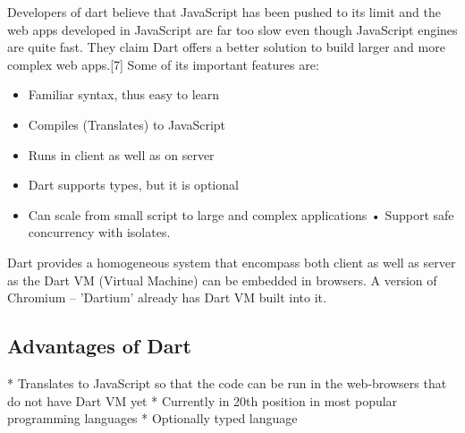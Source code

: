 Developers of dart believe that JavaScript has been pushed to its limit and the web apps developed in JavaScript are far too slow even though JavaScript engines are quite fast. They claim Dart offers a better solution to build larger and more complex web apps.[7]
Some of its important features are:
  \begin{itemize}
  \item Familiar syntax, thus easy to learn
  \item Compiles (Translates) to JavaScript
  \item Runs in client as well as on server
  \item Dart supports types, but it is optional
  \item Can scale from small script to large and complex applications • Support safe concurrency with isolates.
  \end{itemize}

  Dart provides a homogeneous system that encompass both client as well as server as the Dart VM (Virtual Machine) can be embedded in browsers. A version of Chromium – ’Dartium’ already has Dart VM built into it.

  \subsection{Advantages of Dart}
  * Translates to JavaScript so that the code can be run in the web-browsers that do not have Dart VM yet
  * Currently in 20th position in most popular programming languages
  * Optionally typed language

